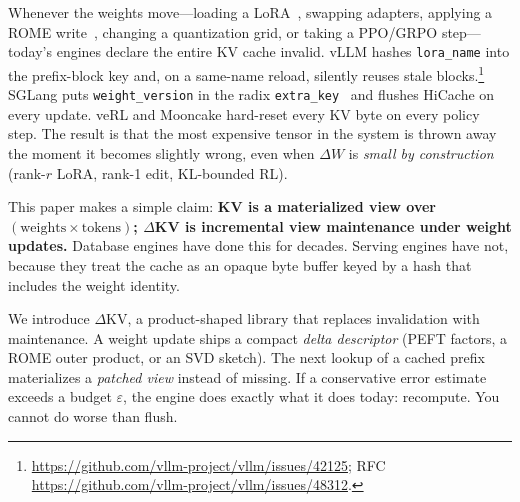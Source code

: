 \documentclass{article}
\newcommand{\dkv}{$\Delta$KV}
\begin{document}
Whenever the weights move---loading a LoRA~\citep{hu2022lora}, swapping
adapters, applying a ROME write~\citep{meng2022rome}, changing a
quantization grid, or taking a PPO/GRPO step---today's engines declare the
entire KV cache invalid.
vLLM hashes \texttt{lora\_name} into the prefix-block key and, on a
same-name reload, silently reuses stale
blocks.\footnote{\url{https://github.com/vllm-project/vllm/issues/42125};
RFC \url{https://github.com/vllm-project/vllm/issues/48312}.}
SGLang puts \texttt{weight\_version} in the radix
\texttt{extra\_key}~\citep{sglang-weight-version} and flushes HiCache on
every update.
veRL and Mooncake hard-reset every KV byte on every policy step.
The result is that the most expensive tensor in the system is thrown away
the moment it becomes slightly wrong, even when $\Delta W$ is
\emph{small by construction} (rank-$r$ LoRA, rank-1 edit, KL-bounded RL).

This paper makes a simple claim:
\textbf{KV is a materialized view over $(\text{weights}\times\text{tokens})$;
$\Delta$KV is incremental view maintenance under weight updates.}
Database engines have done this for decades.
Serving engines have not, because they treat the cache as an opaque byte
buffer keyed by a hash that includes the weight identity.

We introduce \dkv, a product-shaped library that replaces invalidation with
maintenance.
A weight update ships a compact \emph{delta descriptor} (PEFT factors,
a ROME outer product, or an SVD sketch).
The next lookup of a cached prefix materializes a \emph{patched view}
instead of missing.
If a conservative error estimate exceeds a budget $\varepsilon$, the
engine does exactly what it does today: recompute.
You cannot do worse than flush.
\end{document}
